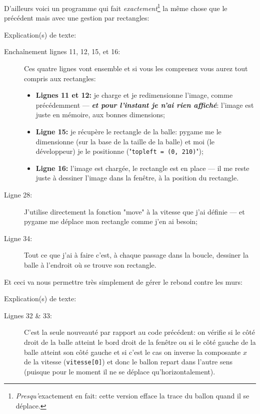 \documentclass[11pt]{article}
\begin{document}
	D'ailleurs voici un programme qui fait \textit{exactement}\footnote{\textit{Presqu'}exactement en fait: cette version efface la trace du ballon quand il se déplace.} la même chose que le précédent mais avec une gestion par rectangles:
	
	
	Explication(s) de texte:
	\begin{description}
		\item[Enchaînement lignes 11, 12, 15, et 16:] Ces quatre lignes vont ensemble et si vous les comprenez vous aurez tout compris aux rectangles:
		\begin{itemize}
			\item \textbf{Lignes 11 et 12:} je charge et je redimensionne l'image, comme précédemment --- \textbf{\textit{et pour l'instant je n'ai rien affiché}}: l'image est juste en mémoire, aux bonnes dimensions;
			\item \textbf{Ligne 15:} je récupère le rectangle de la balle: pygame me le dimensionne (sur la base de la taille de la balle) et moi (le développeur) je le positionne ("\texttt{topleft = (0, 210)}");
			\item \textbf{Ligne 16:} l'image est chargée, le rectangle est en place --- il me reste juste à dessiner l'image dans la fenêtre, à la position du rectangle.
		\end{itemize}
		\item[Ligne 28:] J'utilise directement la fonction "move" à la vitesse que j'ai définie --- et pygame me déplace mon rectangle comme j'en ai besoin;
		\item[Ligne 34:] Tout ce que j'ai à faire c'est, à chaque passage dans la boucle, dessiner la balle à l'endroit où se trouve son rectangle.
	\end{description}
	
	Et ceci va nous permettre très simplement de gérer le rebond contre les murs:
	
	
	Explication(s) de texte:
	\begin{description}
		\item[Lignes 32 \& 33:] C'est la seule nouveauté par rapport au code précédent: on vérifie si le côté droit de la balle atteint le bord droit de la fenêtre ou si le côté gauche de la balle atteint son côté gauche et si c'est le cas on inverse la composante $x$ de la vitesse (\texttt{vitesse[0]}) et donc le ballon repart dans l'autre sens (puisque pour le moment il ne se déplace qu'horizontalement).
	\end{description}
\end{document}
